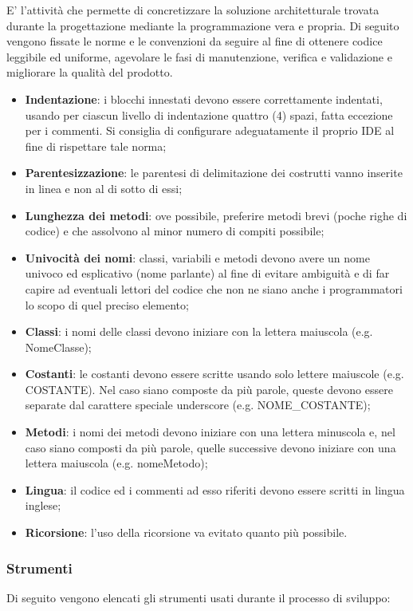              E' l'attività che permette di concretizzare la soluzione architetturale trovata durante la progettazione mediante la programmazione vera e propria.
             Di seguito vengono fissate le norme e le convenzioni da seguire al fine di ottenere codice leggibile ed uniforme, agevolare le fasi di manutenzione, verifica e validazione e migliorare la qualità del prodotto.
             \begin{itemize}
             	\item{\textbf{Indentazione}: i blocchi innestati devono essere correttamente indentati, usando per ciascun livello di indentazione quattro (4) spazi, fatta eccezione per i commenti. Si consiglia di configurare adeguatamente il proprio IDE al fine di rispettare tale norma;}
		\item{\textbf{Parentesizzazione}: le parentesi di delimitazione dei costrutti vanno inserite in linea e non al di sotto di essi;}
		\item{\textbf{Lunghezza dei metodi}: ove possibile, preferire metodi brevi (poche righe di codice) e che assolvono al minor numero di compiti possibile;}
		\item{\textbf{Univocità dei nomi}: classi, variabili e metodi devono avere un nome univoco ed esplicativo (nome parlante) al fine di evitare ambiguità e di far capire ad eventuali lettori del codice che non ne siano anche i programmatori lo scopo di quel preciso elemento;}
		\item{\textbf{Classi}: i nomi delle classi devono iniziare con la lettera maiuscola (e.g. NomeClasse);}
		\item{\textbf{Costanti}: le costanti devono essere scritte usando solo lettere maiuscole (e.g. COSTANTE). Nel caso siano composte da più parole, queste devono essere separate dal carattere speciale underscore (e.g. NOME\_COSTANTE);}
		\item{\textbf{Metodi}: i nomi dei metodi devono iniziare con una lettera minuscola e, nel caso siano composti da più parole, quelle successive devono iniziare con una lettera maiuscola (e.g. nomeMetodo);}
		\item{\textbf{Lingua}: il codice ed i commenti ad esso riferiti devono essere scritti in lingua inglese;}
                	\item{\textbf{Ricorsione}: l'uso della ricorsione va evitato quanto più possibile.}
		\end{itemize}
                
        \subsubsection{Strumenti}
        Di seguito vengono elencati gli strumenti usati durante il processo di sviluppo: